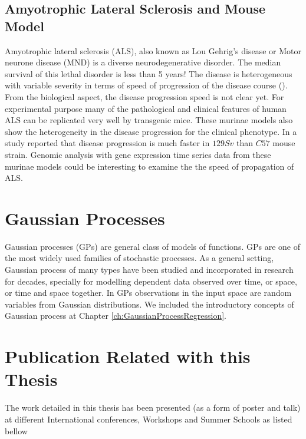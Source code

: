 \subsection{Amyotrophic Lateral Sclerosis and Mouse Model}
Amyotrophic lateral sclerosis (ALS), also known as Lou Gehrig's disease or Motor neurone disease (MND) is a diverse neurodegenerative disorder. The median survival of this lethal disorder is less than 5 years! The disease is heterogeneous with variable severity in terms of speed of progression of the disease course (\cite{Brockington:2013, Peviani:2010}). From the biological aspect, the disease progression speed is not clear yet. For experimental purpose many of the pathological and clinical features of human ALS can be replicated very well by transgenic mice. These murinae models also show the heterogeneity in the disease progression for the clinical phenotype. In a study \cite{Pizzasegola:2009} reported that disease progression is much faster in $129Sv$ than $C57$ mouse strain. Genomic analysis with gene expression time series data from these murinae models could be interesting to examine the the speed of propagation of ALS.

\section{Gaussian Processes}
Gaussian processes (GPs) are general class of models of functions. GPs are one of the most widely used families of stochastic processes. As a general setting, Gaussian process of many types have been studied and incorporated in research for decades, specially for modelling dependent data observed over time, or space, or time and space together. In GPs observations in the input space are random variables from Gaussian distributions. We included the introductory concepts of Gaussian process at Chapter \ref{ch:GaussianProcessRegression}.

\section{Publication Related with this Thesis}
The work detailed in this thesis has been presented (as a form of poster and talk) at different International conferences, Workshops and Summer Schools as listed bellow

